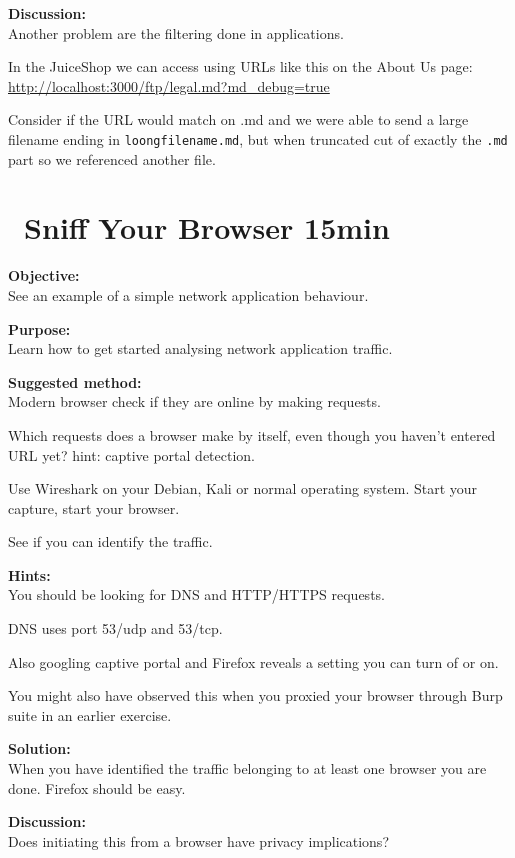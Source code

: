 \documentclass[a4paper,11pt,notitlepage]{report}
\begin{document}
{\bf Discussion:}\\
Another problem are the filtering done in applications.

In the JuiceShop we can access using URLs like this on the About Us page:\\
\url{http://localhost:3000/ftp/legal.md?md_debug=true}

Consider if the URL would match on .md and we were able to send a large filename ending in \verb+loongfilename.md+, but when truncated cut of exactly the \verb+.md+ part so we referenced another file.


\chapter{\faInfoCircle\ Sniff Your Browser 15min}
\label{ex:sniff-captive-portal}


{\bf Objective:}\\
See an example of a simple network application behaviour.

{\bf Purpose:}\\
Learn how to get started analysing network application traffic.

{\bf Suggested method:}\\
Modern browser check if they are online by making requests.

Which requests does a browser make by itself, even though you haven't entered URL yet? hint: captive portal detection.

Use Wireshark on your Debian, Kali or normal operating system. Start your capture, start your browser.

See if you can identify the traffic.

{\bf Hints:}\\
You should be looking for DNS and HTTP/HTTPS requests.

DNS uses port 53/udp and 53/tcp.

Also googling captive portal and Firefox reveals a setting you can turn of or on.

You might also have observed this when you proxied your browser through Burp suite in an earlier exercise.

{\bf Solution:}\\
When you have identified the traffic belonging to at least one browser you are done. Firefox should be easy.

{\bf Discussion:}\\
Does initiating this from a browser have privacy implications?
\end{document}
